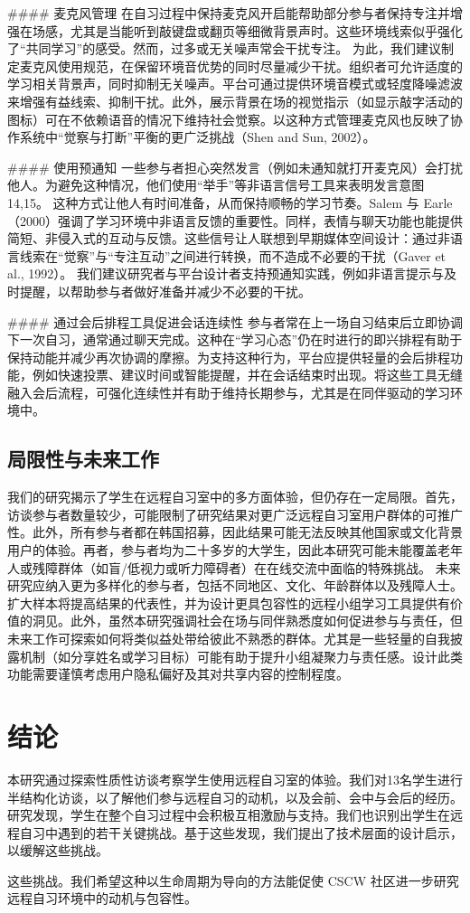 \documentclass[12pt]{ctexart}
\begin{document}
\#\#\#\# 麦克风管理
在自习过程中保持麦克风开启能帮助部分参与者保持专注并增强在场感，尤其是当能听到敲键盘或翻页等细微背景声时。这些环境线索似乎强化了“共同学习”的感受。然而，过多或无关噪声常会干扰专注。
为此，我们建议制定麦克风使用规范，在保留环境音优势的同时尽量减少干扰。组织者可允许适度的学习相关背景声，同时抑制无关噪声。平台可通过提供环境音模式或轻度降噪滤波来增强有益线索、抑制干扰。此外，展示背景在场的视觉指示（如显示敲字活动的图标）可在不依赖语音的情况下维持社会觉察。以这种方式管理麦克风也反映了协作系统中“觉察与打断”平衡的更广泛挑战（Shen and Sun, 2002）。

\#\#\#\# 使用预通知
一些参与者担心突然发言（例如未通知就打开麦克风）会打扰他人。为避免这种情况，他们使用“举手”等非语言信号工具来表明发言意图14,15。
这种方式让他人有时间准备，从而保持顺畅的学习节奏。Salem 与 Earle（2000）强调了学习环境中非语言反馈的重要性。同样，表情与聊天功能也能提供简短、非侵入式的互动与反馈。这些信号让人联想到早期媒体空间设计：通过非语言线索在“觉察”与“专注互动”之间进行转换，而不造成不必要的干扰（Gaver et al., 1992）。
我们建议研究者与平台设计者支持预通知实践，例如非语言提示与及时提醒，以帮助参与者做好准备并减少不必要的干扰。

\#\#\#\# 通过会后排程工具促进会话连续性
参与者常在上一场自习结束后立即协调下一次自习，通常通过聊天完成。这种在“学习心态”仍在时进行的即兴排程有助于保持动能并减少再次协调的摩擦。为支持这种行为，平台应提供轻量的会后排程功能，例如快速投票、建议时间或智能提醒，并在会话结束时出现。将这些工具无缝融入会后流程，可强化连续性并有助于维持长期参与，尤其是在同伴驱动的学习环境中。

\subsection{局限性与未来工作}
我们的研究揭示了学生在远程自习室中的多方面体验，但仍存在一定局限。首先，访谈参与者数量较少，可能限制了研究结果对更广泛远程自习室用户群体的可推广性。此外，所有参与者都在韩国招募，因此结果可能无法反映其他国家或文化背景用户的体验。再者，参与者均为二十多岁的大学生，因此本研究可能未能覆盖老年人或残障群体（如盲/低视力或听力障碍者）在在线交流中面临的特殊挑战。
未来研究应纳入更为多样化的参与者，包括不同地区、文化、年龄群体以及残障人士。扩大样本将提高结果的代表性，并为设计更具包容性的远程小组学习工具提供有价值的洞见。此外，虽然本研究强调社会在场与同伴熟悉度如何促进参与与责任，但未来工作可探索如何将类似益处带给彼此不熟悉的群体。尤其是一些轻量的自我披露机制（如分享姓名或学习目标）可能有助于提升小组凝聚力与责任感。设计此类功能需要谨慎考虑用户隐私偏好及其对共享内容的控制程度。

\section{结论}
本研究通过探索性质性访谈考察学生使用远程自习室的体验。我们对13名学生进行半结构化访谈，以了解他们参与远程自习的动机，以及会前、会中与会后的经历。研究发现，学生在整个自习过程中会积极互相激励与支持。我们也识别出学生在远程自习中遇到的若干关键挑战。基于这些发现，我们提出了技术层面的设计启示，以缓解这些挑战。

这些挑战。我们希望这种以生命周期为导向的方法能促使 CSCW 社区进一步研究远程自习环境中的动机与包容性。
\end{document}
